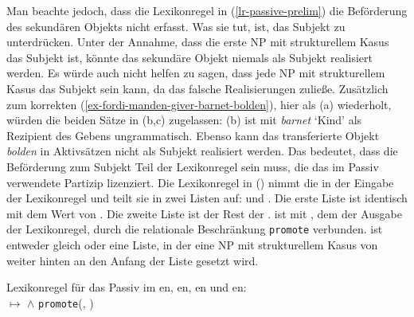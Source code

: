 Man beachte jedoch, dass die Lexikonregel in (\ref{lr-passive-prelim}) die Beförderung
des sekundären Objekts nicht erfasst. Was sie tut, ist, das Subjekt zu unterdrücken. Unter der Annahme, dass die
erste NP mit strukturellem Kasus das Subjekt ist, könnte das sekundäre Objekt niemals als
Subjekt realisiert werden. Es würde auch nicht helfen zu sagen, dass jede NP mit strukturellem Kasus das Subjekt sein kann, da
das falsche Realisierungen zuließe. Zusätzlich zum korrekten
(\ref{ex-fordi-manden-giver-barnet-bolden}), hier als (a) wiederholt, würden die
beiden Sätze in (b,c) zugelassen:
\eal
{}
\zl
(b) ist mit \emph{barnet} `Kind' als Rezipient des Gebens ungrammatisch. Ebenso kann das
transferierte Objekt \emph{bolden} in Aktivsätzen nicht als Subjekt realisiert werden. Das bedeutet, dass
die Beförderung zum Subjekt Teil der Lexikonregel sein muss, die das im Passiv verwendete Partizip lizenziert. Die Lexikonregel in () nimmt die \argstl in der Eingabe der Lexikonregel und teilt sie in zwei
Listen auf:  und . Die erste Liste  ist identisch mit dem Wert von \da. Die zweite Liste  ist der
Rest der \argstl.  ist mit , dem \argstw der Ausgabe der Lexikonregel, durch die relationale Beschränkung
\texttt{promote} verbunden.  ist entweder gleich  oder eine Liste, in der eine NP mit
strukturellem Kasus von weiter hinten an den Anfang der Liste gesetzt wird.

\eas
\label{lr-passive-double-object}%
Lexikonregel für das Passiv im en, en, en und en:\\
 $\mapsto$
 $\wedge$ \texttt{promote}(, )
\zs

